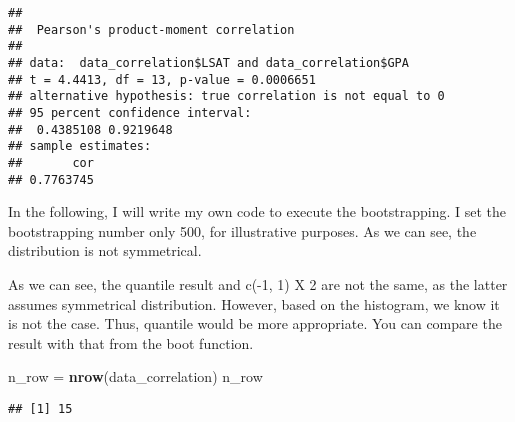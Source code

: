 \documentclass[]{book}
\newenvironment{Shaded}{\begin{snugshade}}{\end{snugshade}}
\newcommand{\ControlFlowTok}[1]{\textcolor[rgb]{0.13,0.29,0.53}{\textbf{#1}}}
\newcommand{\DataTypeTok}[1]{\textcolor[rgb]{0.13,0.29,0.53}{#1}}
\newcommand{\DecValTok}[1]{\textcolor[rgb]{0.00,0.00,0.81}{#1}}
\newcommand{\KeywordTok}[1]{\textcolor[rgb]{0.13,0.29,0.53}{\textbf{#1}}}
\newcommand{\NormalTok}[1]{#1}
\newcommand{\OperatorTok}[1]{\textcolor[rgb]{0.81,0.36,0.00}{\textbf{#1}}}
\newcommand{\OtherTok}[1]{\textcolor[rgb]{0.56,0.35,0.01}{#1}}
\newcommand{\StringTok}[1]{\textcolor[rgb]{0.31,0.60,0.02}{#1}}
\begin{document}
\begin{verbatim}
## 
##  Pearson's product-moment correlation
## 
## data:  data_correlation$LSAT and data_correlation$GPA
## t = 4.4413, df = 13, p-value = 0.0006651
## alternative hypothesis: true correlation is not equal to 0
## 95 percent confidence interval:
##  0.4385108 0.9219648
## sample estimates:
##       cor 
## 0.7763745
\end{verbatim}

In the following, I will write my own code to execute the bootstrapping. I set the bootstrapping number only 500, for illustrative purposes. As we can see, the distribution is not symmetrical.

As we can see, the quantile result and c(-1, 1) X 2 are not the same, as the latter assumes symmetrical distribution. However, based on the histogram, we know it is not the case. Thus, quantile would be more appropriate. You can compare the result with that from the boot function.

\begin{Shaded}
\begin{Highlighting}[]
\NormalTok{n_row =}\StringTok{ }\KeywordTok{nrow}\NormalTok{(data_correlation)}
\NormalTok{n_row}
\end{Highlighting}
\end{Shaded}

\begin{verbatim}
## [1] 15
\end{verbatim}

\begin{Shaded}
\end{Shaded}
\end{document}
